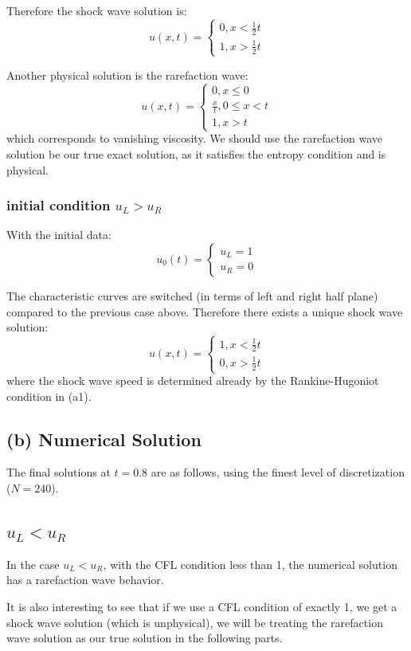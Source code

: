 \documentclass[12pt]{article} %
\begin{document}
Therefore the shock wave solution is:
$$
	u(x,t) = \begin{cases}
		0, x < \frac12 t \\
		1, x>\frac12 t
	\end{cases} 
$$

Another physical solution is the rarefaction wave:
$$
	u(x,t) = \begin{cases}
		0, x \le 0 \\
		\frac{x}{t}, 0 \le x < t\\
		1, x> t
	\end{cases} 
$$ which corresponds to vanishing viscosity. We should use the rarefaction wave solution be our true exact solution, as it satisfies the entropy condition and is physical.
\subsubsection{initial condition $u_L > u_R$}
With the initial data:
$$
	u_0(t) = 
	\begin{cases}
		u_L = 1 \\
		u_R = 0
	\end{cases}
$$

The characteristic curves are switched (in terms of left and right half plane) compared to the previous case above. Therefore there exists a unique shock wave solution:
$$
	u(x,t) =
	\begin{cases}
		1, x < \frac12 t \\
		0, x > \frac{1}{2}t
	\end{cases}
$$ where the shock wave speed is determined already by the Rankine-Hugoniot condition in (a1).


\subsection{(b) Numerical Solution}
The final solutions at $t = 0.8$ are as follows, using  the finest level of discretization ($N=240$).
\subsection{$u_L < u_R$}
In the case $u_L<u_R$, with the CFL condition less than 1, the numerical solution has a rarefaction wave behavior.

It is also interesting to see that if we use a CFL condition of exactly 1, we get a shock wave solution (which is unphysical), we will be treating the rarefaction wave solution as our true solution in the following parts.
\end{document}
